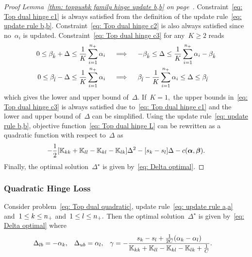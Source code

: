 \toprulebb*
\begin{proof}[Proof Lemma~\ref{thm: toppushk family hinge update b,b} on page~\pageref{thm: toppushk family hinge update b,b}]
  Constraint~\eqref{eq: Top dual hinge c1} is always satisfied from the definition of the update rule~\eqref{eq: update rule b,b}. Constraint~\eqref{eq: Top dual hinge c2} is also always satisfied since no~$\alpha_i$ is updated. Constraint~\eqref{eq: Top dual hinge c3} for any~$K \geq 2$ reads
  \begin{align*}
    0 \leq \beta_{\hat{k}} + \Delta \leq \frac{1}{K} \sum_{i = 1}^{n_{+}} \alpha_i 
    & \quad \implies \quad
    -\beta_{\hat{k}} \leq \Delta \leq \frac{1}{K} \sum_{i = 1}^{n_{+}} \alpha_i - \beta_{\hat{k}} \\
    0 \leq \beta_{\hat{l}} - \Delta \leq \frac{1}{K} \sum_{i = 1}^{n_{+}} \alpha_i
    & \quad \implies \quad
    \beta_{\hat{l}} - \frac{1}{K} \sum_{i = 1}^{n_{+}} \alpha_i \leq \Delta \leq \beta_{\hat{l}}
  \end{align*}
  which gives the lower and upper bound of~$\Delta.$ If~$K = 1,$ the upper bounds in~\eqref{eq: Top dual hinge c3} is always satisfied due to~\eqref{eq: Top dual hinge c1} and the lower and upper bound of~$\Delta$ can be simplified. Using the update rule~\eqref{eq: update rule b,b}, objective function~\eqref{eq: Top dual hinge L} can be rewritten as a quadratic function with respect to~$\Delta$ as
  \begin{equation*}
    - \frac{1}{2} \Brac[s]{\K_{kk} + \K_{ll} - \K_{kl} - \K_{lk}} \Delta^2
    - \Brac[s]{s_k - s_l} \Delta
    - c(\bm{\alpha}, \bm{\beta}).
  \end{equation*}
  Finally, the optimal solution~$\Delta^{\star}$ is given by~\eqref{eq: Delta optimal}.
\end{proof}

\subsubsection{Quadratic Hinge Loss}

\begin{lemma}\label{thm: toppushk family quadratic update a,a}
  Consider problem~\eqref{eq: Top dual quadratic}, update rule~\eqref{eq: update rule a,a} and~$1 \leq k \leq n_{+}$ and~$1 \leq l \leq n_{+}.$ Then the optimal solution~$\Delta^{\star}$ is given by~\eqref{eq: Delta optimal} where
  \begin{align*}
    \Delta_{lb} & = -\alpha_k, &
    \Delta_{ub} & = \alpha_l, &
    \gamma & = -\frac{s_k - s_l + \frac{1}{2C}(\alpha_k - \alpha_l)}{\mathbb{K}_{kk} + \mathbb{K}_{ll} - \mathbb{K}_{kl} - \mathbb{K}_{lk} + \frac{1}{C}}.
  \end{align*}
\end{lemma}

